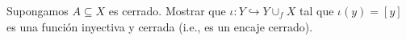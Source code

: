 \begin{ejercicio}
        Supongamos $A\subseteq X$ es cerrado. Mostrar que $\iota: Y\hookrightarrow Y\cup_f X$ tal que $\iota(y)=[y]$ es una función inyectiva y cerrada (i.e., es un encaje cerrado).
    \end{ejercicio}

\begin{demostracion}

\end{demostracion}
